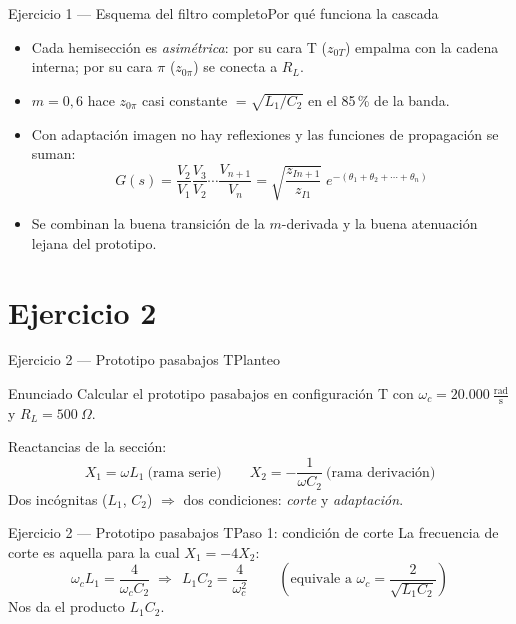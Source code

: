 \documentclass[10pt, aspectratio=169]{beamer}
\begin{document}
\begin{frame}{Ejercicio 1 --- Esquema del filtro completo}{Por qué funciona la cascada}
  \begin{itemize}\setlength{\itemsep}{2ex}
    \item Cada hemisección es \emph{asimétrica}: por su cara T ($z_{0T}$) empalma con la
          cadena interna; por su cara $\pi$ ($z_{0\pi}$) se conecta a $R_L$.
    \item $m=0{,}6$ hace $z_{0\pi}$ casi constante $=\sqrt{L_1/C_2}$ en el 85\,\% de la banda.
    \item Con adaptación imagen no hay reflexiones y las \alert{funciones de propagación se suman}:
    \[
        G(s)=\frac{V_2}{V_1}\frac{V_3}{V_2}\dotsm\frac{V_{n+1}}{V_n}
        =\sqrt{\frac{z_{In+1}}{z_{I1}}}\;e^{-(\theta_1+\theta_2+\dotsb+\theta_n)}
    \]
    \item Se combinan la buena transición de la $m$-derivada y la buena atenuación
          lejana del prototipo.
  \end{itemize}
\end{frame}

\section{Ejercicio 2}

\begin{frame}{Ejercicio 2 --- Prototipo pasabajos T}{Planteo}
  \begin{block}{Enunciado}
    Calcular el prototipo pasabajos en configuración T con
    $\omega_c = 20.000\ \frac{\text{rad}}{\text{s}}$ y $R_L = 500\ \Omega$.
  \end{block}
  \vspace{1ex}
  Reactancias de la sección:
  \[
      X_1 = \omega L_1\ \text{(rama serie)}\qquad
      X_2 = -\frac{1}{\omega C_2}\ \text{(rama derivación)}
  \]
  Dos incógnitas ($L_1$, $C_2$) $\Rightarrow$ dos condiciones: \emph{corte} y \emph{adaptación}.
\end{frame}

\begin{frame}{Ejercicio 2 --- Prototipo pasabajos T}{Paso 1: condición de corte}
  La frecuencia de corte es aquella para la cual $X_1 = -4X_2$:
  \[
      \omega_c L_1 = \frac{4}{\omega_c C_2}
      \;\Longrightarrow\;
      \boxed{\,L_1 C_2 = \frac{4}{\omega_c^2}\,}
      \qquad\left(\text{equivale a }\omega_c = \frac{2}{\sqrt{L_1 C_2}}\right)
  \]
  \vspace{1ex}
  Nos da el \alert{producto} $L_1 C_2$.
\end{frame}
\end{document}
